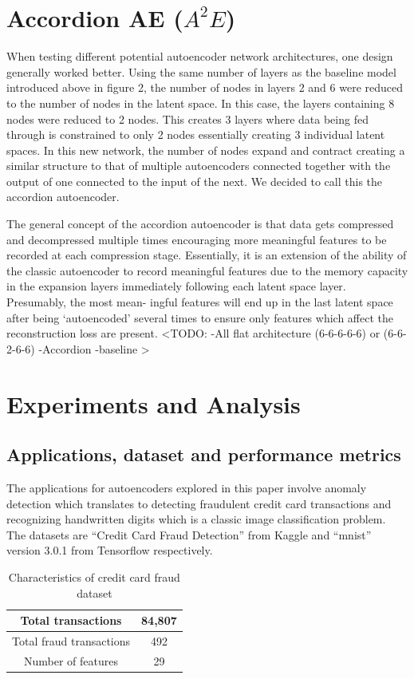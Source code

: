\documentclass[conference]{IEEEtran}
\begin{document}
\section{Accordion AE ($A^2E$)}
When testing different potential autoencoder network architectures, one design generally worked better. Using the same number of layers as the baseline model introduced above in figure 2, the number of nodes in layers 2 and 6 were reduced to the number of nodes in the latent space. In this case, the layers containing 8 nodes were reduced to 2 nodes. This creates 3 layers where data being fed through is constrained to only 2 nodes essentially creating 3 individual latent spaces. In this new network, the number of nodes expand and contract creating a similar structure to that of multiple autoencoders connected together with the output of one connected to the input of the next. We decided to call this the accordion autoencoder.

The general concept of the accordion autoencoder is that data gets compressed and decompressed multiple times encouraging more meaningful features to be recorded at each compression stage. Essentially, it is an extension of the ability of the classic autoencoder to record meaningful features due to the memory capacity in the expansion layers immediately following each latent space layer. Presumably, the most mean- ingful features will end up in the last latent space after being ‘autoencoded’ several times to ensure only features which affect the reconstruction loss are present.
<TODO:
-All flat architecture (6-6-6-6-6) or (6-6-2-6-6)
-Accordion
-baseline
>

\section{Experiments and Analysis}

\subsection{Applications, dataset and performance metrics}
The applications for autoencoders explored in this paper involve anomaly detection which translates to detecting fraudulent credit card transactions and recognizing handwritten digits which is a classic image classification problem. The datasets are “Credit Card Fraud Detection” from Kaggle and “mnist” version 3.0.1 from Tensorflow respectively.

\begin{table}
    \caption{Characteristics of credit card fraud dataset}
    \label{tab:fraud_characteristics}
    \begin{center}
        \begin{tabular}{ |c|c| }
            \hline
            Total transactions & 84,807 \\
            \hline
            Total fraud transactions & 492 \\
            \hline
            Number of features & 29 \\
            \hline
        \end{tabular}
    \end{center}
\end{table}
\end{document}

